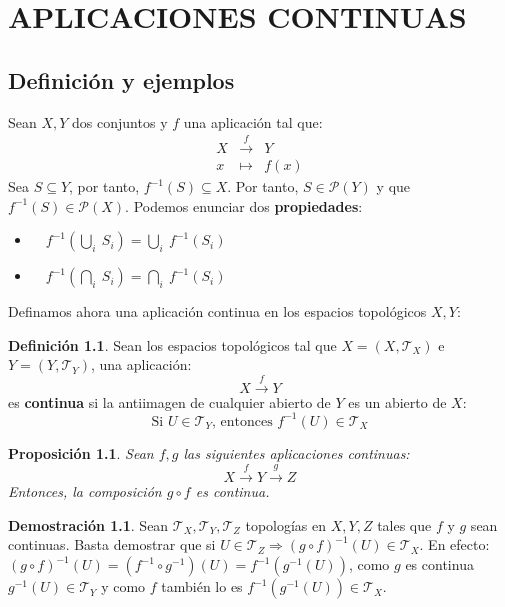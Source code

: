 \documentclass[12pt,twoside]{report}
\newcommand\mc[1]{\mathcal{#1}}
\theoremstyle{azul}
\theoremstyle{azul2}
\theoremstyle{plain}
\newtheorem*{prop}{Proposición}
\theoremstyle{definition}
\newtheorem*{defi}{Definición}
\newtheorem*{dem}{Demostración}
\theoremstyle{remark}
\begin{document}
\chapter{APLICACIONES CONTINUAS}
\section{Definición y ejemplos}
Sean $X,Y$ dos conjuntos y $f$ una aplicación tal que:
$$\begin{array}{rcl}
      X & \stackrel{f}{\longrightarrow} & Y \\
     x & \longmapsto & f(x)
\end{array}$$
Sea $S \subseteq Y$, por tanto, $f^{-1}(S) \subseteq X$. Por tanto, $S \in \mathcal{P}(Y)$ y que $f^{-1}(S) \in \mathcal{P}(X)$. Podemos enunciar dos \textbf{propiedades}:\vspace{-3mm}
\begin{itemize}
    \item $ \quad f^{-1}(\underset{i}\bigcup \: S_i)=\underset{i}\bigcup \: f^{-1}(S_i)$
    \item $ \quad f^{-1}(\underset{i}\bigcap \: S_i)=\underset{i}\bigcap \: f^{-1}(S_i)$
\end{itemize}
Definamos ahora una aplicación continua en los espacios topológicos $X,Y$:
\begin{defi}
Sean los espacios topológicos tal que $X=(X,\mc{T}_X)$ e $Y=(Y,\mc{T}_Y)$, una aplicaci{\'on}:
$$X \stackrel{f}{\longrightarrow} Y$$
es \textbf{continua} \label{def:conti}si la antiimagen de cualquier abierto de $Y$ es un abierto de $X$:
$$\text{Si } U\in \mc{T}_Y \text{, entonces } f^{-1}(U) \in \mc{T}_X$$
\end{defi}
\begin{prop}
Sean $f,g$ las siguientes aplicaciones continuas:
$$X \stackrel{f}{\longrightarrow} Y \stackrel{g}{\longrightarrow} Z$$
Entonces, la composición $g\circ f$ es continua.
\end{prop}
\begin{dem}
Sean $\mc{T}_X, \mc{T}_Y, \mc{T}_Z$ topologías en $X,Y,Z$ tales que $f$ y $g$ sean continuas. Basta demostrar que  si $U\in\mc{T}_Z\Rightarrow(g\circ f)^{-1}(U)\in \mc{T}_X$. En efecto: $(g\circ f)^{-1}(U)=(f^{-1}\circ g^{-1})(U)=f^{-1}(g^{-1}(U))$, como $g$ es continua $g^{-1}(U)\in\mc{T}_Y$ y como $f$ también lo es $f^{-1}(g^{-1}(U))\in \mc{T}_X$.
\end{dem}
\end{document}
